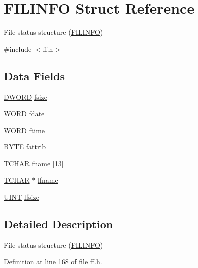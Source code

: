 \hypertarget{structFILINFO}{}\section{F\+I\+L\+I\+N\+FO Struct Reference}
\label{structFILINFO}


File status structure (\hyperlink{structFILINFO}{F\+I\+L\+I\+N\+FO})  




{\ttfamily \#include $<$ff.\+h$>$}

\subsection*{Data Fields}
\begin{DoxyCompactItemize}
\item 
\hyperlink{integer_8h_ad342ac907eb044443153a22f964bf0af}{D\+W\+O\+RD} \hyperlink{structFILINFO_aee7441af7dc0c443d1e1e6011cc7dcac}{fsize}
\item 
\hyperlink{integer_8h_a197942eefa7db30960ae396d68339b97}{W\+O\+RD} \hyperlink{structFILINFO_a7c01c48a15b1b49da459924437b0bd52}{fdate}
\item 
\hyperlink{integer_8h_a197942eefa7db30960ae396d68339b97}{W\+O\+RD} \hyperlink{structFILINFO_ae0f751b79621bf7b29669f177bbe6b9a}{ftime}
\item 
\hyperlink{integer_8h_a4ae1dab0fb4b072a66584546209e7d58}{B\+Y\+TE} \hyperlink{structFILINFO_a838d542585831b085537b363f18205c0}{fattrib}
\item 
\hyperlink{ff_8h_a03bdb8ce5895c7e261aadc2529637546}{T\+C\+H\+AR} \hyperlink{structFILINFO_abd852510f2f79b4ec773156d8942dc7c}{fname} \mbox{[}13\mbox{]}
\item 
\hyperlink{ff_8h_a03bdb8ce5895c7e261aadc2529637546}{T\+C\+H\+AR} $\ast$ \hyperlink{structFILINFO_ac4506c29e0219130dff46b01a1b5c023}{lfname}
\item 
\hyperlink{integer_8h_a36cb3b01d81ffd844bbbfb54003e06ec}{U\+I\+NT} \hyperlink{structFILINFO_a2527c511ff4d12d285dbf3c4b3c9fb7b}{lfsize}
\end{DoxyCompactItemize}


\subsection{Detailed Description}
File status structure (\hyperlink{structFILINFO}{F\+I\+L\+I\+N\+FO}) 

Definition at line 168 of file ff.\+h.




